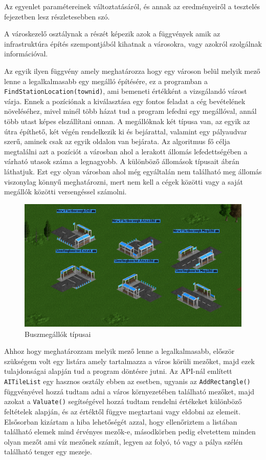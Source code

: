 Az egyenlet paramétereinek változtatásáról, és annak az eredményeiről a tesztelés fejezetben lesz részletesebben szó.


A városkezelő osztálynak a részét képezik azok a függvények amik az infrastruktúra építés szempontjából kihatnak a városokra, vagy azokról szolgálnak információval.

Az egyik ilyen függvény amely meghatározza hogy egy városon belül melyik mező lenne a legalkalmasabb egy megálló építésére, ez a programban a \\ \texttt{FindStationLocation(townid)}, ami bemeneti értékként a vizsgálandó várost várja. Ennek a pozíciónak a kiválasztása egy fontos feladat a cég bevételének növeléséhez, mivel minél több házat tud a program lefedni egy megállóval, annál több utast képes elszállítani onnan. A megállóknak két típusa van, az egyik az útra építhető, két végén rendelkezik ki és bejárattal, valamint egy pályaudvar szerű, aminek csak az egyik oldalon van bejárata. Az algoritmus fő célja megtalálni azt a pozíciót a városban ahol a lerakott állomás lefedettségében a várható utasok száma a legnagyobb. A különböző állomások típusait  ábrán láthatjuk. Ezt egy olyan városban ahol még egyáltalán nem található meg állomás viszonylag könnyű meghatározni, mert nem kell a cégek közötti vagy a saját megállók közötti versengéssel számolni.

\begin{figure}
	\centering
	\includegraphics[width=\textwidth]{images/megallok.png}
	\caption{Buszmegállók típusai}
	\label{fig:megallok}
\end{figure}

Ahhoz hogy meghatározzam melyik mező lenne a legalkalmasabb, először szükségem volt egy listára amely tartalmazza a város körüli mezőket, majd ezek tulajdonságai alapján tud a program döntésre jutni. Az API-nál említett \texttt{AITileList} egy hasznos osztály ebben az esetben, ugyanis az \texttt{AddRectangle()} függvényével hozzá tudtam adni a város környezetében található mezőket, majd azokat a \texttt{Valuate()} segítségével hozzá tudtam rendelni értékeket különböző feltételek alapján, és az értéktől függve megtartani vagy eldobni az elemeit. Elsősorban kizártam a hiba lehetőségét azzal, hogy ellenőriztem a listában található elemek mind érvényes mezők-e, másodkörben pedig elvetettem minden olyan mezőt ami víz mezőnek számít, legyen az folyó, tó vagy a pálya szélén található tenger egy mezeje.


